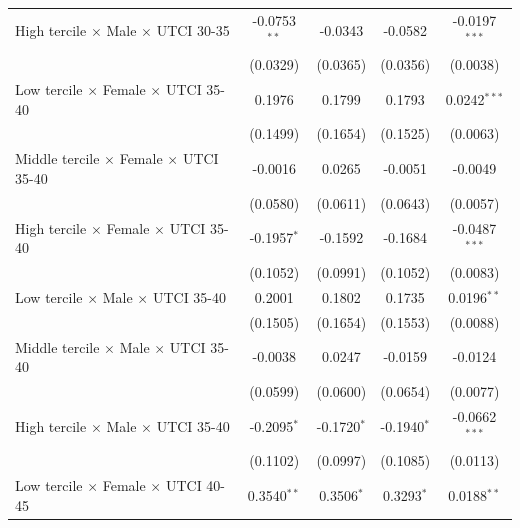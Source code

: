 \begin{table}[htbp]
\begin{tabular}{lcccc}
      High tercile $\times$ Male $\times$ UTCI 30-35       & -0.0753$^{**}$  & -0.0343             & -0.0582           & -0.0197$^{***}$\\   
                                                           & (0.0329)        & (0.0365)            & (0.0356)          & (0.0038)\\   
      Low tercile $\times$ Female $\times$ UTCI 35-40      & 0.1976          & 0.1799              & 0.1793            & 0.0242$^{***}$\\   
                                                           & (0.1499)        & (0.1654)            & (0.1525)          & (0.0063)\\   
      Middle tercile $\times$ Female $\times$ UTCI 35-40   & -0.0016         & 0.0265              & -0.0051           & -0.0049\\   
                                                           & (0.0580)        & (0.0611)            & (0.0643)          & (0.0057)\\   
      High tercile $\times$ Female $\times$ UTCI 35-40     & -0.1957$^{*}$   & -0.1592             & -0.1684           & -0.0487$^{***}$\\   
                                                           & (0.1052)        & (0.0991)            & (0.1052)          & (0.0083)\\   
      Low tercile $\times$ Male $\times$ UTCI 35-40        & 0.2001          & 0.1802              & 0.1735            & 0.0196$^{**}$\\   
                                                           & (0.1505)        & (0.1654)            & (0.1553)          & (0.0088)\\   
      Middle tercile $\times$ Male $\times$ UTCI 35-40     & -0.0038         & 0.0247              & -0.0159           & -0.0124\\   
                                                           & (0.0599)        & (0.0600)            & (0.0654)          & (0.0077)\\   
      High tercile $\times$ Male $\times$ UTCI 35-40       & -0.2095$^{*}$   & -0.1720$^{*}$       & -0.1940$^{*}$     & -0.0662$^{***}$\\   
                                                           & (0.1102)        & (0.0997)            & (0.1085)          & (0.0113)\\   
      Low tercile $\times$ Female $\times$ UTCI 40-45      & 0.3540$^{**}$   & 0.3506$^{*}$        & 0.3293$^{*}$      & 0.0188$^{**}$\\   

\end{tabular}
\end{table}
